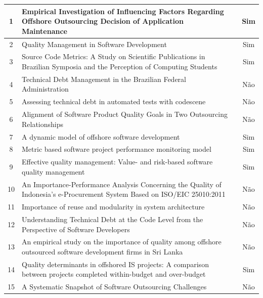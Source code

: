 \begin{longtable}{|c|p{11.5cm}|c|}
    1 & Empirical Investigation of Influencing Factors Regarding Offshore Outsourcing Decision of Application Maintenance~\cite{empirical2021offshore} & Sim \\
    \hline
    2 & Quality Management in Software Development~\cite{qualitymanagdev2024} & Sim \\
    \hline
    3 & Source Code Metrics: A Study on Scientific Publications in Brazilian Symposia and the Perception of Computing Students~\cite{sourcecode2024} & Sim \\
    \hline
    4 & Technical Debt Management in the Brazilian Federal Administration~\cite{souza2015technical} & Não \\
    \hline
    5 & Assessing technical debt in automated tests with codescene~\cite{tornhill2018codescene} & Não \\
    \hline
    6 & Alignment of Software Product Quality Goals in Two Outsourcing Relationships~\cite{alignment2026outsourcing} & Não \\
    \hline
    7 & A dynamic model of offshore software development~\cite{dynamic2001offshore} & Sim \\
    \hline
    8 & Metric based software project performance monitoring model~\cite{doraisamy2016metric} & Sim \\
    \hline
    9 & Effective quality management: Value- and risk-based software quality management~\cite{felderer2014eqm} & Sim \\
    \hline
    10 & An Importance-Performance Analysis Concerning the Quality of Indonesia's e-Procurement System Based on ISO/EIC 25010:2011~\cite{karsanti2023importance} & Não \\
    \hline
    11 & Importance of reuse and modularity in system architecture~\cite{dano2019modularity} & Não \\
    \hline
    12 & Understanding Technical Debt at the Code Level from the Perspective of Software Developers~\cite{sbes2017technical} & Não \\
    \hline
    13 & An empirical study on the importance of quality among offshore outsourced software development firms in Sri Lanka~\cite{csed2013quality} & Não \\
    \hline
    14 & Quality determinants in offshored IS projects: A comparison between projects completed within-budget and over-budget~\cite{qualitydeterminants} & Sim \\
    \hline
    15 & A Systematic Snapshot of Software Outsourcing Challenges~\cite{jebreen2023systematic} & Não \\

\end{longtable}
